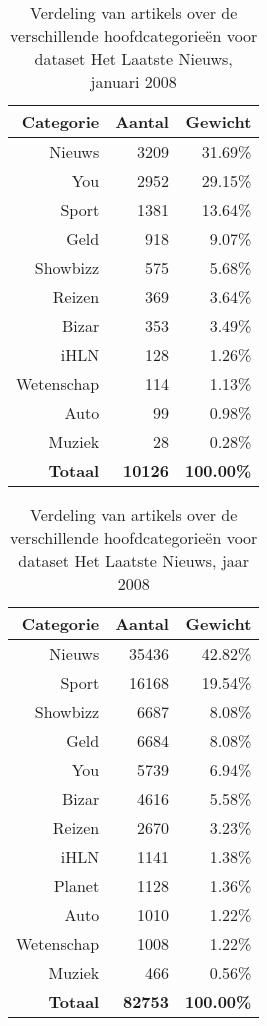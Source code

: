 \begin{table}[htbp]
	\centering
	\caption{Verdeling van artikels over de verschillende hoofdcategorie\"en voor dataset Het Laatste Nieuws, januari 2008}
	\begin{tabular}{rrr}
		\toprule
		Categorie & Aantal & Gewicht \\
		\midrule
		Nieuws & 3209  & 31.69\% \\
		You   & 2952  & 29.15\% \\
		Sport & 1381  & 13.64\% \\
		Geld  & 918   & 9.07\% \\
		Showbizz & 575   & 5.68\% \\
		Reizen & 369   & 3.64\% \\
		Bizar & 353   & 3.49\% \\
		iHLN  & 128   & 1.26\% \\
		Wetenschap & 114   & 1.13\% \\
		Auto  & 99    & 0.98\% \\
		Muziek & 28    & 0.28\% \\
		\textbf{Totaal} & \textbf{10126} &\textbf{ 100.00\%} \\
		\bottomrule
	\end{tabular}%
	\label{tab:hln-2008-01-cat}%
\end{table}%


\begin{table}[htbp]
	\centering
	\caption{Verdeling van artikels over de verschillende hoofdcategorie\"en voor dataset Het Laatste Nieuws, jaar 2008}
	\begin{tabular}{rrr}
		\toprule
		Categorie & Aantal & Gewicht \\
		\midrule
		Nieuws & 35436 & 42.82\% \\
		Sport & 16168 & 19.54\% \\
		Showbizz & 6687  & 8.08\% \\
		Geld  & 6684  & 8.08\% \\
		You   & 5739  & 6.94\% \\
		Bizar & 4616  & 5.58\% \\
		Reizen & 2670  & 3.23\% \\
		iHLN  & 1141  & 1.38\% \\
		Planet & 1128  & 1.36\% \\
		Auto  & 1010  & 1.22\% \\
		Wetenschap & 1008  & 1.22\% \\
		Muziek & 466   & 0.56\% \\
		\textbf{Totaal} & \textbf{82753} & \textbf{100.00\%} \\
		\bottomrule
	\end{tabular}%
	\label{tab:hln-2008-cat}%
\end{table}%

